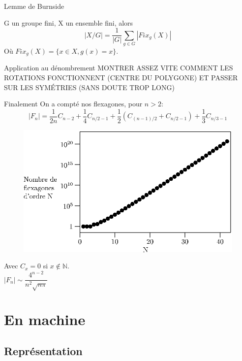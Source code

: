 \documentclass[french,xcolor=dvipsnames]{beamer}
\begin{document}
		\begin{frame}{Lemme de Burnside}
			\begin{theorem}
				G un groupe fini, X un ensemble fini, alors
				\[
				|X/G| = \frac{1}{|G|}\sum_{g\in G}{|Fix_{g}(X)|}
				\]
				Où $Fix_{g}(X) = \{x\in X, g(x) = x\}$.
			\end{theorem}
		\end{frame}
		
		\begin{frame}{Application au dénombrement}
			MONTRER ASSEZ VITE COMMENT LES ROTATIONS FONCTIONNENT (CENTRE DU POLYGONE) ET PASSER SUR LES SYMÉTRIES (SANS DOUTE TROP LONG)
		\end{frame}
		
		\begin{frame}{Finalement}
		On a compté nos flexagones, pour $n>2$:
		{\large
		\[
			|F_{n}| = \frac{1}{2n}C_{n-2} + \frac{1}{4}C_{n/2-1} + \frac{1}{2}(C_{(n-1)/2}+C_{n/2-1}) + \frac{1}{3}C_{n/3-1}
		\]
		}
		\begin{figure}
			\includegraphics[scale=0.6]{nombre_flexagones.eps}
		\end{figure}
		\begin{flushleft}
			Avec $C_{x} = 0$ si $x \not\in \mathbb{N}$.\\
		$|F_{n}| \sim \dfrac{4^{n-2}}{n^{2}\sqrt{n\pi}}$
		\end{flushleft}
	\end{frame}
		



	\section{En machine}
		\subsection{Représentation}
		
\end{document}
